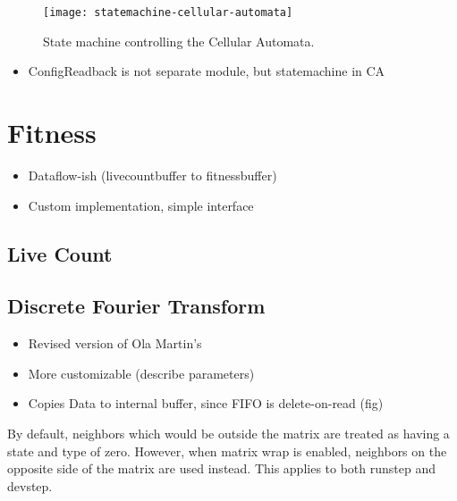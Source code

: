\begin{figure}[!ht]
    \centering
    \texttt{[image: statemachine-cellular-automata]}
    \caption[Cellular Automata state machine]{
        State machine controlling the Cellular Automata.
    }
    \label{fig:statemachine-cellular-automata}
\end{figure}

\begin{itemize}
    \item ConfigReadback is not separate module, but statemachine in CA
\end{itemize}


\section{Fitness}

\begin{itemize}
    \item Dataflow-ish (livecountbuffer to fitnessbuffer)
    \item Custom implementation, simple interface
\end{itemize}

\subsection{Live Count}


\subsection{Discrete Fourier Transform}

\begin{itemize}
    \item Revised version of Ola Martin's
    \item More customizable (describe parameters)
    \item Copies Data to internal buffer, since FIFO is delete-on-read (fig)
\end{itemize}


By default, neighbors which would be outside the matrix are treated as having a state and type of zero.
However, when matrix wrap is enabled, neighbors on the opposite side of the matrix are used instead.
This applies to both runstep and devstep.
